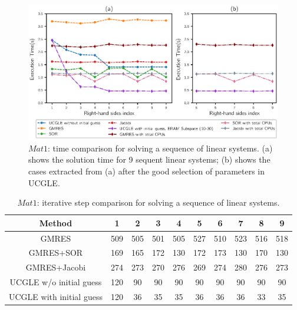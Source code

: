 \begin{figure}[t]
	\centering
	\includegraphics[width=0.99\linewidth]{fig/seqrhs1.eps}
	\caption{$Mat1$: time comparison for solving a sequence of linear systems. (a) shows the solution time for 9 sequent linear systems; (b) shows the cases extracted from (a) after the good selection of parameters in UCGLE.}
	\label{fig:seqrhs1}
\end{figure}

\begin{table}[t]
	\small
	\label{tb1}
	\caption{$Mat1$: iterative step comparison for solving a sequence of linear systems.}
	\centering
	\renewcommand{\arraystretch}{1.6}
	\begin{tabular}{c*{9}{c}}
		\toprule
		\cellcolor{gray!50}Method              & \cellcolor{gray!50}1 &  \cellcolor{gray!50}2 &  \cellcolor{gray!50}3 &  \cellcolor{gray!50}4 &  \cellcolor{gray!50}5  &  \cellcolor{gray!50}6  & \cellcolor{gray!50}7 & \cellcolor{gray!50}8 & \cellcolor{gray!50}9\\
		\midrule
		GMRES & 509 & 505 & 501 & 505 & 527 & 510  &523&516& 518\\
		\cellcolor{gray!20}GMRES+SOR            & 	\cellcolor{gray!20}169 & 	\cellcolor{gray!20}165 & 	\cellcolor{gray!20}172 & 	\cellcolor{gray!20}130 & 	\cellcolor{gray!20}172 & 	\cellcolor{gray!20}173 &	\cellcolor{gray!20}130&	\cellcolor{gray!20}170&	\cellcolor{gray!20}130\\
		GMRES+Jacobi            & 274 & 273 & 270 & 276 & 269 & 274 &280&276&273\\
		\cellcolor{gray!20}UCGLE w/o initial guess     & 	\cellcolor{gray!20}120 & 	\cellcolor{gray!20}90 & 	\cellcolor{gray!20}90 & 	\cellcolor{gray!20}90 & 	\cellcolor{gray!20}90 &	\cellcolor{gray!20}90 &	\cellcolor{gray!20}90&	\cellcolor{gray!20}90& 	\cellcolor{gray!20}90\\
		UCGLE with initial guess     & 120 & 36 & 35 & 35 & 36 &36  &36&33&35\\
		\hline
	\end{tabular}
\end{table}

